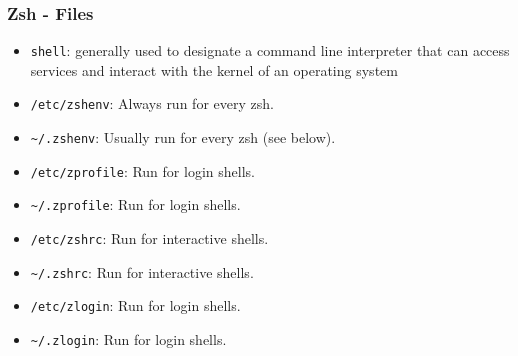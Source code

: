 \subsubsection{Zsh - Files}
\begin{frame}[fragile]{\subsubsecname}
  \begin{itemize}
    \item \texttt{shell}: generally used to designate a command line interpreter that can access services and interact with the kernel of an operating system
    \item \texttt{/etc/zshenv}: Always run for every zsh.
    \item \texttt{\textasciitilde{}/.zshenv}: Usually run for every zsh (see below).
    \item \texttt{/etc/zprofile}: Run for login shells.
    \item \texttt{\textasciitilde{}/.zprofile}: Run for login shells.
    \item \texttt{/etc/zshrc}: Run for interactive shells.
    \item \texttt{\textasciitilde{}/.zshrc}: Run for interactive shells.
    \item \texttt{/etc/zlogin}: Run for login shells.
    \item \texttt{\textasciitilde{}/.zlogin}: Run for login shells.
  \end{itemize}
\end{frame}
